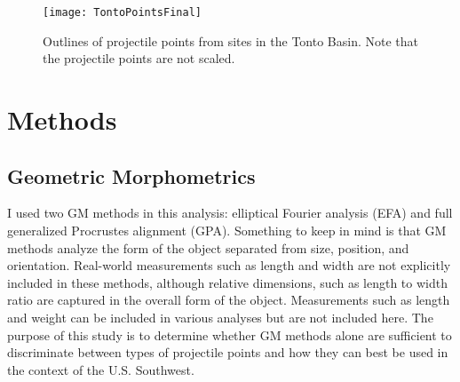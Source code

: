 \documentclass[PCJ,Unicode,screen,mode=plain]{cedram}
\begin{document}
\begin{figure}
\texttt{[image: TontoPointsFinal]} \caption{Outlines of projectile points from sites in the Tonto Basin. Note that the projectile points are not scaled.}\label{fig:TontoPointsFinal}
\end{figure}

\section{Methods}

\subsection{Geometric Morphometrics}

I used two GM methods in this analysis: elliptical Fourier analysis (EFA) and full generalized Procrustes alignment (GPA). Something to keep in mind is that GM methods analyze the form of the object separated from size, position, and orientation. Real-world measurements such as length and width are not explicitly included in these methods, although relative dimensions, such as length to width ratio are captured in the overall form of the object. Measurements such as length and weight can be included in various analyses but are not included here. The purpose of this study is to determine whether GM methods alone are sufficient to discriminate between types of projectile points and how they can best be used in the context of the U.S. Southwest.
\end{document}
